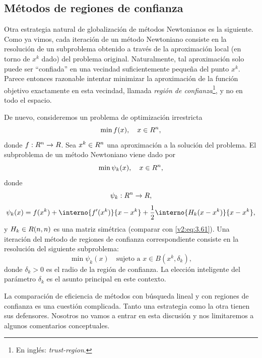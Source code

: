 
\subsection{Métodos de regiones de confianza}\label{v2:sec:3.3.2}

Otra estrategia natural de globalización de métodos Newtonianos es la siguiente. Como ya vimos, cada iteración de un método Newtoniano consiste en la resolución de un subproblema obtenido a través de la aproximación local (en torno de $x^k$ dado) del problema original. Naturalmente, tal aproximación solo puede ser ``confiada'' en una vecindad suficientemente pequeña del punto $x^k$. Parece entonces razonable intentar minimizar la aproximación de la función objetivo exactamente en esta vecindad, llamada \textit{región de confianza}\footnote{En inglés: \textit{trust-region}.}, y no en todo el espacio.

De nuevo, consideremos un problema de optimización irrestricta
\begin{equation}
    \min f(x), \quad x \in R^n,
    \label{v2:eq:3.83}
\end{equation}
donde $f : R^n \to R$. Sea $x^k \in R^n$ una aproximación a la solución del problema. El subproblema de un método Newtoniano viene dado por
\begin{equation}
    \min \psi_k(x), \quad x \in R^n,
    \label{v2:eq:3.84}
\end{equation}
donde
\[
    \psi_k : R^n \to R,
\]
\begin{equation}
    \psi_k(x) = f(x^k) + \interno{f'(x^k)}{x - x^k} + \frac{1}{2}\interno{H_k(x - x^k)}{x - x^k},
    \label{v2:eq:3.85}
\end{equation}
y $H_k \in R(n, n)$ es una matriz simétrica (comparar con \eqref{v2:eq:3.61}).
Una iteración del método de regiones de confianza correspondiente consiste en la resolución del siguiente subproblema:
\begin{equation}
    \min \psi_k(x) \quad \text{sujeto a } x \in B(x^k, \delta_k),
    \label{v2:eq:3.86}
\end{equation}
donde $\delta_k > 0$ es el radio de la región de confianza. La elección inteligente del parámetro $\delta_k$ es el asunto principal en este contexto.

La comparación de eficiencia de métodos con búsqueda lineal y con regiones de confianza es una cuestión complicada. Tanto una estrategia como la otra tienen sus defensores. Nosotros no vamos a entrar en esta discusión y nos limitaremos a algunos comentarios conceptuales.

